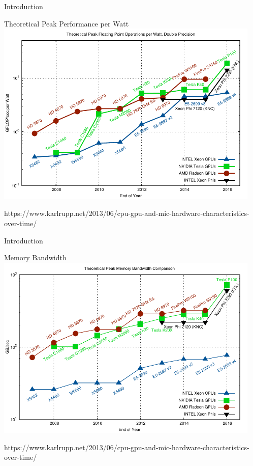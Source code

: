 \begin{frame}{Introduction}
 \vspace*{-0.5cm}
 \begin{center}
  Theoretical Peak Performance per Watt \\
  \includegraphics[width=0.95\textwidth]{figures/gflops-per-watt-dp}
 \end{center}
 \vspace*{-0.5cm}
 {\tiny https://www.karlrupp.net/2013/06/cpu-gpu-and-mic-hardware-characteristics-over-time/ }
\end{frame}

\begin{frame}{Introduction}
 \vspace*{-0.5cm}
 \begin{center}
  Memory Bandwidth \\
  \includegraphics[width=0.95\textwidth]{figures/mem-bw}
 \end{center}
 \vspace*{-0.5cm}
 {\tiny https://www.karlrupp.net/2013/06/cpu-gpu-and-mic-hardware-characteristics-over-time/ }
\end{frame}

